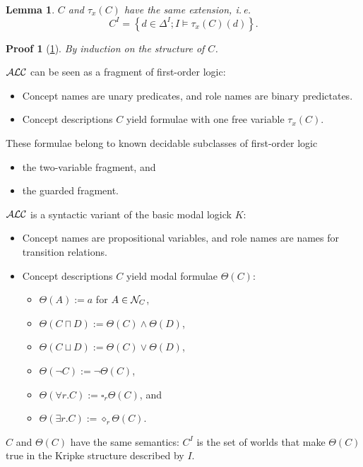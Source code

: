 \documentclass[openany]{scrbook}
\theoremstyle{break}
\newtheorem{Lemma}[Theorem]{Lemma}
\theoremstyle{nonumberbreak}
\theoremstyle{nonumberplain}
\theoremstyle{nonumberbreak}
\newtheorem{Proof}{Proof}
\newcommand{\set}[1]{\left\{#1\right\}}
\newcommand{\ie}{i{.}\,e{.}\xspace}
\newcommand{\ALC}{{\cal A}{\cal L}{\cal C}}
\begin{document}
\begin{Lemma}
  \label{2.3}
  $C$ and $\tau_x(C)$ have the same extension, \ie
  \begin{equation*}
    C^I = \set{d \in \Delta^I; I \models \tau_x(C)(d)}.
  \end{equation*}
\end{Lemma}

\begin{Proof}[\cref{2.3}]
  By induction on the structure of $C$.
\end{Proof}

$\ALC$ can be seen as a fragment of first-order logic:
\begin{itemize}
\item Concept names are unary predicates, and role names are binary
  predictates.
\item Concept descriptions $C$ yield formulae with one free variable
  $\tau_x(C)$.
\end{itemize}
These formulae belong to known decidable subclasses of first-order
logic
\begin{itemize}
\item the two-variable fragment, and
\item the guarded fragment.
\end{itemize}

$\ALC$ is a syntactic variant of the basic modal logick $K$:
\begin{itemize}
\item Concept names are propositional variables, and role names are
  names for transition relations.
\item Concept descriptions $C$ yield modal formulae $\Theta(C)$:
  \begin{itemize}
  \item $\Theta(A) := a$ for $A \in {\cal N}_C$,
  \item $\Theta(C \sqcap D) := \Theta(C) \wedge \Theta(D)$,
  \item $\Theta(C \sqcup D) := \Theta(C) \vee \Theta(D)$,
  \item $\Theta(\neg C) := \neg\Theta(C)$,
  \item $\Theta(\forall r.C) := \square_r \Theta(C)$, and
  \item $\Theta(\exists r.C) := \diamond_r \Theta(C)$.
  \end{itemize}
\end{itemize}

$C$ and $\Theta(C)$ have the same semantics: $C^I$ is the set of
worlds that make $\Theta(C)$ true in the Kripke structure described by
$I$.
\end{document}
